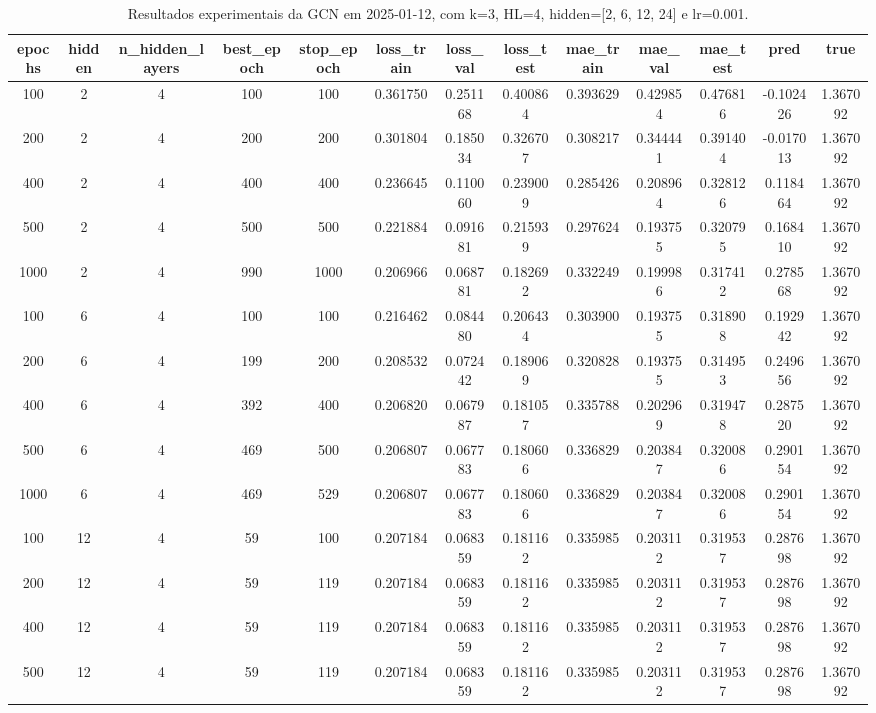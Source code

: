 \begin{table}[h]
\centering
\caption{Resultados experimentais da GCN em 2025-01-12, com k=3, HL=4, hidden=[2, 6, 12, 24] e lr=0.001.}
\label{tab:gcn_results_k3_hl4_d20250112}
\begin{tabular}{ccccccccccccc}
\toprule
epochs & hidden & n\_hidden\_layers & best\_epoch & stop\_epoch & loss\_train & loss\_val & loss\_test & mae\_train & mae\_val & mae\_test & pred & true \\
\midrule
100 & 2 & 4 & 100 & 100 & 0.361750 & 0.251168 & 0.400864 & 0.393629 & 0.429854 & 0.476816 & -0.102426 & 1.367092 \\
200 & 2 & 4 & 200 & 200 & 0.301804 & 0.185034 & 0.326707 & 0.308217 & 0.344441 & 0.391404 & -0.017013 & 1.367092 \\
400 & 2 & 4 & 400 & 400 & 0.236645 & 0.110060 & 0.239009 & 0.285426 & 0.208964 & 0.328126 & 0.118464 & 1.367092 \\
500 & 2 & 4 & 500 & 500 & 0.221884 & 0.091681 & 0.215939 & 0.297624 & 0.193755 & 0.320795 & 0.168410 & 1.367092 \\
1000 & 2 & 4 & 990 & 1000 & 0.206966 & 0.068781 & 0.182692 & 0.332249 & 0.199986 & 0.317412 & 0.278568 & 1.367092 \\
100 & 6 & 4 & 100 & 100 & 0.216462 & 0.084480 & 0.206434 & 0.303900 & 0.193755 & 0.318908 & 0.192942 & 1.367092 \\
200 & 6 & 4 & 199 & 200 & 0.208532 & 0.072442 & 0.189069 & 0.320828 & 0.193755 & 0.314953 & 0.249656 & 1.367092 \\
400 & 6 & 4 & 392 & 400 & 0.206820 & 0.067987 & 0.181057 & 0.335788 & 0.202969 & 0.319478 & 0.287520 & 1.367092 \\
500 & 6 & 4 & 469 & 500 & 0.206807 & 0.067783 & 0.180606 & 0.336829 & 0.203847 & 0.320086 & 0.290154 & 1.367092 \\
1000 & 6 & 4 & 469 & 529 & 0.206807 & 0.067783 & 0.180606 & 0.336829 & 0.203847 & 0.320086 & 0.290154 & 1.367092 \\
100 & 12 & 4 & 59 & 100 & 0.207184 & 0.068359 & 0.181162 & 0.335985 & 0.203112 & 0.319537 & 0.287698 & 1.367092 \\
200 & 12 & 4 & 59 & 119 & 0.207184 & 0.068359 & 0.181162 & 0.335985 & 0.203112 & 0.319537 & 0.287698 & 1.367092 \\
400 & 12 & 4 & 59 & 119 & 0.207184 & 0.068359 & 0.181162 & 0.335985 & 0.203112 & 0.319537 & 0.287698 & 1.367092 \\
500 & 12 & 4 & 59 & 119 & 0.207184 & 0.068359 & 0.181162 & 0.335985 & 0.203112 & 0.319537 & 0.287698 & 1.367092 \\

\end{tabular}
\end{table}
